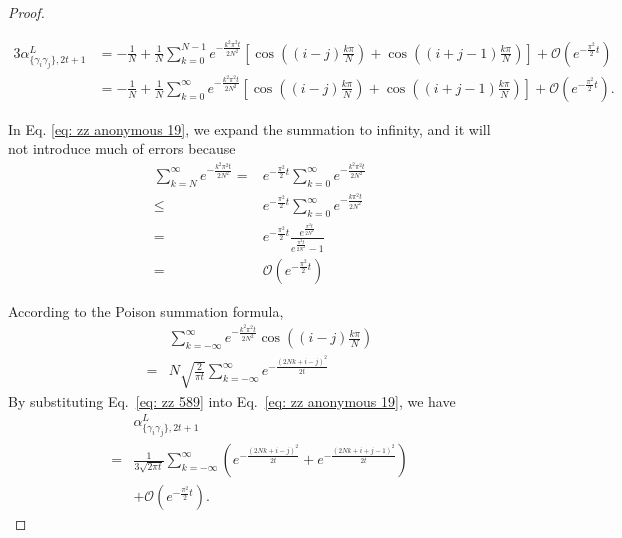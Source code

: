 \documentclass[showpacs,twocolumn,aps,prx,long bibliography,superscriptaddress,notitlepage]{revtex4-1}
\newcommand{\alpl}{\alpha_{\{\gamma_i\gamma_j\}, 2t+1}^{L}}
\begin{document}
\begin{proof}
\begin{widetext}
    \begin{align}
3\alpl& =-\frac{1}{N}+\frac{1}{N} \sum_{k=0}^{N-1} e^{-\frac{k^2 \pi^2 t}{2 N^2}}\left[\cos \left((i-j) \frac{k \pi}{N}\right)+\cos \left((i+j-1) \frac{k \pi}{N}\right)\right]+\mathcal{O}\left(e^{-\frac{\pi^2}{2}t}\right)\\
& =-\frac{1}{N}+\frac{1}{N} \sum_{k=0}^{\infty}e^{-\frac{k^2 \pi^2 t}{2 N^2}}\left[\cos \left((i-j) \frac{k \pi}{N}\right)+\cos \left((i+j-1) \frac{k \pi}{N}\right)\right]+\mathcal{O}\left(e^{-\frac{\pi^2}{2}t}\right).
\label{eq: zz anonymous 19}
\end{align}
\end{widetext}
In Eq. \eqref{eq: zz anonymous 19}, we expand the summation to infinity, and it will not introduce much of errors because 
\begin{align*}
    \sum_{k=N}^{\infty} e^{-\frac{k^2 \pi^2 t}{2 N^2}} =& e^{-\frac{\pi^2}{2}t}\sum_{k=0}^{\infty} e^{-\frac{k^2 \pi^2 t}{2 N^2}} \\
    \leq& e^{-\frac{\pi^2}{2}t}\sum_{k=0}^{\infty} e^{-\frac{k \pi^2 t}{2 N^2}} \\
    =& e^{-\frac{\pi^2}{2}t} \frac{e^{\frac{\pi^2 t}{2 N^2}}}{e^{\frac{\pi^2 t}{2 N^2}} -1 } \\
    =& \mathcal{O}\left(e^{-\frac{\pi^2}{2}t}\right)
\end{align*}



According to the Poison summation formula, 
\begin{equation}
\begin{aligned}
    &\sum_{k=-\infty}^{\infty} e^{-\frac{k^2 \pi^2 t}{2 N^2}}\cos \left((i-j) \frac{k \pi}{N}\right) \\
    =& N\sqrt{\frac{2}{\pi t}}\sum_{k=-\infty}^{\infty} e^{-\frac{(2Nk+i-j)^2}{2t}}
\end{aligned}
    \label{eq: zz 589}
\end{equation}
By substituting Eq.~\eqref{eq: zz 589} into Eq.~\eqref{eq: zz anonymous 19}, we have
\begin{align}
&\alpl \\
= &\frac{1}{3\sqrt{2\pi t}}  \sum_{k=-\infty}^{\infty} \left(e^{-\frac{(2Nk+i-j)^2}{2t}} + e^{-\frac{(2Nk+i+j-1)^2}{2t}} \right) \\
&+\mathcal{O}\left(e^{-\frac{\pi^2}{2}t}\right).
\end{align}


\end{proof}
\end{document}
